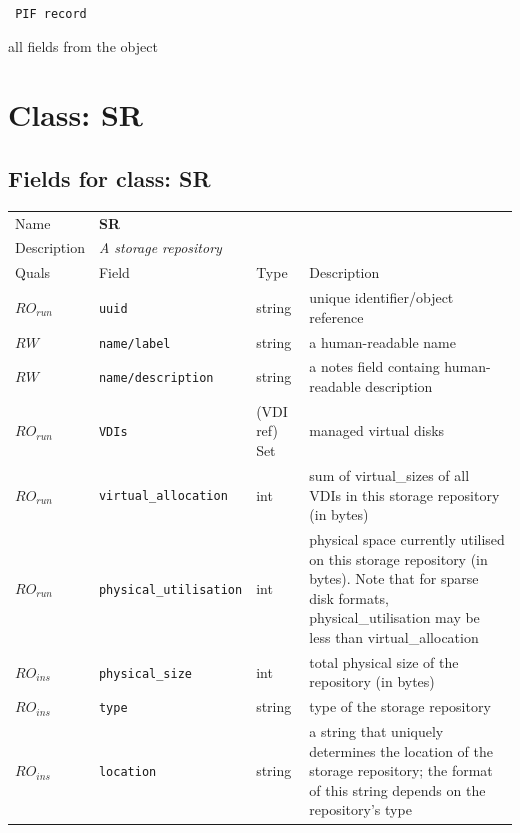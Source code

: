 \vspace{0.3cm}

{\tt 
PIF record
}


all fields from the object
\vspace{0.3cm}
\vspace{0.3cm}
\vspace{0.3cm}

\vspace{1cm}
\newpage
\section{Class: SR}
\subsection{Fields for class: SR}
\begin{longtable}{|lllp{}|}
\hline
\multicolumn{1}{|l}{Name} & \multicolumn{3}{l|}{\bf SR} \\
\multicolumn{1}{|l}{Description} & \multicolumn{3}{l|}{\parbox{11cm}{\em A storage repository}} \\
\hline
Quals & Field & Type & Description \\
\hline
$\mathit{RO}_\mathit{run}$ &  {\tt uuid} & string & unique identifier/object reference \\
$\mathit{RW}$ &  {\tt name/label} & string & a human-readable name \\
$\mathit{RW}$ &  {\tt name/description} & string & a notes field containg human-readable description \\
$\mathit{RO}_\mathit{run}$ &  {\tt VDIs} & (VDI ref) Set & managed virtual disks \\
$\mathit{RO}_\mathit{run}$ &  {\tt virtual\_allocation} & int & sum of virtual\_sizes of all VDIs in this storage repository (in bytes) \\
$\mathit{RO}_\mathit{run}$ &  {\tt physical\_utilisation} & int & physical space currently utilised on this storage repository (in bytes). Note that for sparse disk formats, physical\_utilisation may be less than virtual\_allocation \\
$\mathit{RO}_\mathit{ins}$ &  {\tt physical\_size} & int & total physical size of the repository (in bytes) \\
$\mathit{RO}_\mathit{ins}$ &  {\tt type} & string & type of the storage repository \\
$\mathit{RO}_\mathit{ins}$ &  {\tt location} & string & a string that uniquely determines the location of the storage repository; the format of this string depends on the repository's type \\
\hline
\end{longtable}
